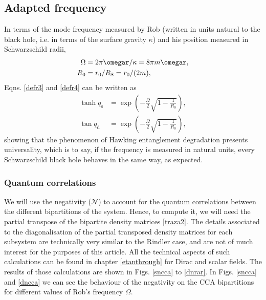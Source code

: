 \subsection{Adapted frequency}

In terms of the mode frequency measured by Rob  (written in units
natural to the black hole, i.e. in terms of the surface gravity $\kappa$) and his position measured in Schwarzschild
radii,
\begin{align}
\Omega&=2\pi\omegar
/\kappa=8\pi m\omegar,\\
R_0&=r_0/R_\text{S}=r_0/(2m),
\end{align}
 Eqns. \eqref{defr3} and
\eqref{defr4} can be written as
\begin{align}\label{defr32}
\tanh q_\text{s}&=\exp\left({-\frac{\Omega}{2} \sqrt{1-\frac{1}{R_0}}}\right),
\\
\label{defr42}
\tan q_\text{d}&=\exp\left({-\frac{\Omega}{2} \sqrt{1-\frac{1}{R_0}}}\right),
\end{align}
showing that the phenomenon of Hawking entanglement degradation
presents universality, which is to say, if the frequency is measured in natural
units, every Schwarzschild black hole behaves in the same way, as
expected.

\subsubsection{Quantum correlations}

We will use the negativity ($\mathcal{N}$) to account for the quantum
correlations between the different bipartitions of the system. Hence, to compute it, we will need the partial transpose of the bipartite
density matrices \eqref{traza2}. The details associated to the
diagonalisation of the partial transposed density matrices for each
subsystem are technically very similar to the Rindler case, and are not of
much interest for the purposes of this article. All the technical aspects of
such calculations can be found in chapter \ref{etanthrough} for Dirac and scalar fields.
The results of those calculations are shown in Figs. \ref{sncca} to
\ref{dnrar}. In Figs. \ref{sncca} and \ref{dncca} we can see the behaviour
of the negativity on the CCA bipartitions for different values of Rob's
frequency $\Omega$.



